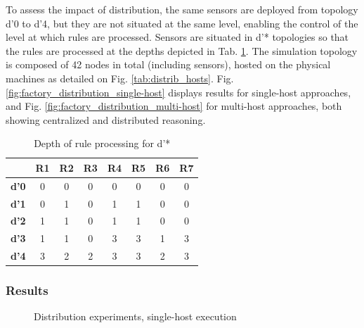 \documentclass{iosart2c}
\begin{document}
To assess the impact of distribution, the same sensors are deployed from topology d'0 to d'4, but they are not situated at the same level, enabling the control of the level at which rules are processed.
Sensors are situated in d'* topologies so that the rules are processed at the depths depicted in Tab. \ref{tab:factory_distrib_topologies}.
The simulation topology is composed of 42 nodes in total (including sensors), hosted on the physical machines as detailed on Fig. \ref{tab:distrib_hosts}.
Fig. \ref{fig:factory_distribution_single-host} displays results for single-host approaches, and Fig. \ref{fig:factory_distribution_multi-host} for multi-host approaches, both showing centralized and distributed reasoning. 

\begin{table}
	\centering
	\caption{Depth of rule processing for d'*}
	\label{tab:factory_distrib_topologies}
	\begin{tabular}{|c|c|c|c|c|c|c|c|}
		\hline
		&\textbf{R1}&\textbf{R2}&\textbf{R3}&\textbf{R4}&\textbf{R5}&\textbf{R6}&\textbf{R7}\\ \hline
		\textbf{d'0}& 0& 0& 0& 0& 0& 0& 0\\ \hline
		\textbf{d'1}& 0& 1& 0& 1& 1& 0& 0\\ \hline
		\textbf{d'2}& 1& 1& 0& 1& 1& 0& 0\\ \hline
		\textbf{d'3}& 1& 1& 0& 3& 3& 1& 3\\ \hline
		\textbf{d'4}& 3& 2& 2& 3& 3& 2& 3\\ \hline
	\end{tabular}
\end{table}

\subsubsection{Results}

\begin{figure}
	\Centering
	\caption{\Centering Distribution experiments, single-host execution}
	\label{fig:factory_distribution_single-host}
	\begin{minipage}{0.395\textwidth}
		\Centering
		\label{fig:factory_distribution_raw_syn}
		\scalebox{0.8}{
			
		}
	
	\end{minipage}
	\begin{minipage}{0.595\textwidth}
		\Centering
		\label{fig:factory_distribution_processed_syn}
		\scalebox{0.8}{
			
		}
	\end{minipage}
\end{figure}
	
\end{document}
